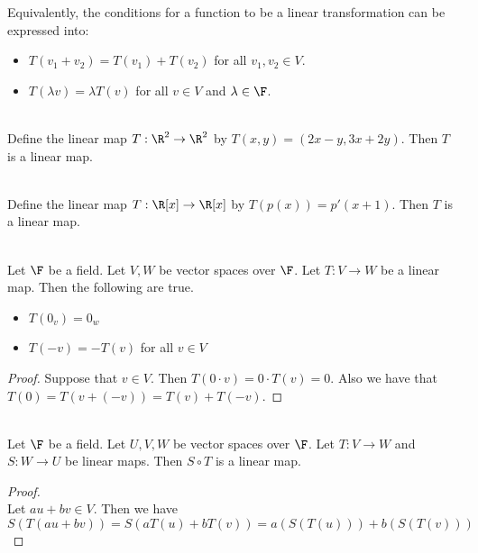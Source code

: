 \documentclass[a4paper]{article}
\begin{document}
Equivalently, the conditions for a function to be a linear transformation can be expressed into: 
\begin{itemize}
\item $T(v_1+v_2)=T(v_1)+T(v_2)$ for all $v_1,v_2\in V$. 
\item $T(\lambda v)=\lambda T(v)$ for all $v\in V$ and $\lambda\in\F$. 
\end{itemize}

\begin{eg}{}{}\\
Define the linear map $T:\R^2\to\R^2$ by $T(x,y)=(2x-y,3x+2y)$. Then $T$ is a linear map. 
\end{eg}

\begin{eg}{}{}\\
Define the linear map $T:\R[x]\to\R[x]$ by $T(p(x))=p'(x+1)$. Then $T$ is a linear map. 
\end{eg}

\begin{lmm}{}{}\\
Let $\F$ be a field. Let $V,W$ be vector spaces over $\F$. Let $T:V\to W$ be a linear map. Then the following are true. 
\begin{itemize}
\item $T(0_v)=0_w$
\item $T(-v)=-T(v)$ for all $v\in V$
\end{itemize}
\begin{proof} Suppose that $v\in V$. Then $T(0\cdot v)=0\cdot T(v)=0$. Also we have that $T(0)=T(v+(-v))=T(v)+T(-v)$. 
\end{proof}
\end{lmm}

\begin{prp}{}{}\\
Let $\F$ be a field. Let $U,V,W$ be vector spaces over $\F$. Let $T:V\to W$ and $S:W\to U$ be linear maps. Then $S\circ T$ is a linear map. 
\begin{proof}\\
Let $au+bv\in V$. Then we have $$S(T(au+bv))=S(aT(u)+bT(v))=a(S(T(u)))+b(S(T(v)))$$
\end{proof}
\end{prp}
\end{document}
